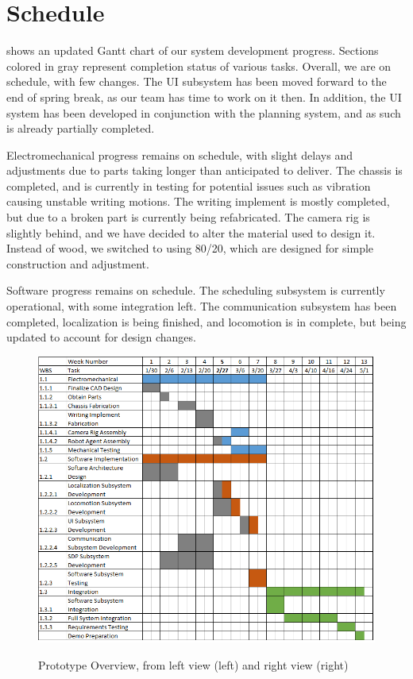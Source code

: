 
\section{Schedule}
\label{sec:schedule}

 shows an updated Gantt chart of our system development progress. Sections colored in gray represent completion status of various tasks. Overall, we are on schedule, with few changes. The UI subsystem has been moved forward to the end of spring break, as our team has time to work on it then. In addition, the UI system has been developed in conjunction with the planning system, and as such is already partially completed.

Electromechanical progress remains on schedule, with slight delays and adjustments due to parts taking longer than anticipated to deliver. The chassis is completed, and is currently in testing for potential issues such as vibration causing unstable writing motions. The writing implement is mostly completed, but due to a broken part is currently being refabricated. The camera rig is slightly behind, and we have decided to alter the material used to design it. Instead of wood, we switched to using 80/20, which are designed for simple construction and adjustment.

Software progress remains on schedule. The scheduling subsystem is currently operational, with some integration left. The communication subsystem has been completed, localization is being finished, and locomotion is in complete, but being updated to account for design changes.

\begin{figure}[h!]
\centering
\includegraphics[width=0.49\columnwidth]{figs/gantt_chart_3_1_17.png}
\label{fig:gantt_3_7}
\caption{Prototype Overview, from left view (left) and right view (right)}
\end{figure}

